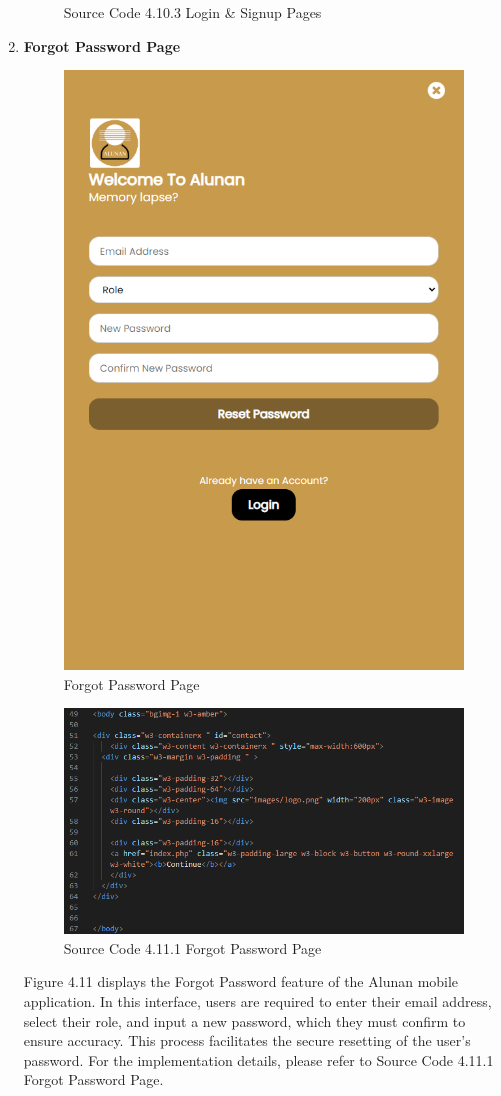 \begin{enumerate}[1.]
\begin{figure}[h]
\begin{subfigure}[b]{0.6\textwidth}
            \label{fig:sub5}
        \end{subfigure}
        \caption*{Source Code 4.10.3 Login \& Signup Pages}
        \label{fig:myfig49c}
    \end{figure}

    \item \textbf{Forgot Password Page}
    \begin{figure}[h]
        \centering
        \includegraphics[width=0.4\linewidth]{mainmatter/images/frontend/ss/Forgot Password.png}
        \caption{Forgot Password Page}
        \label{fig:myfig50}
    \end{figure}
    \clearpage
    \begin{figure}[h]
        \centering
        \includegraphics[width=0.6\linewidth]{mainmatter/images/frontend/code/frontpage.png}
        \caption*{Source Code 4.11.1 Forgot Password Page}
        \label{fig:myfig50a}
    \end{figure}
    Figure 4.11 displays the Forgot Password feature of the Alunan mobile application. In this interface, users are required to enter their email address, select their role, and input a new password, which they must confirm to ensure accuracy. This process facilitates the secure resetting of the user's password. For the implementation details, please refer to Source Code 4.11.1 Forgot Password Page.


\end{enumerate}
